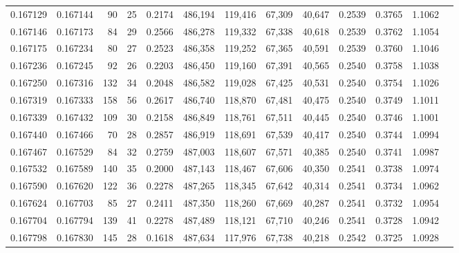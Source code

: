 \begin{tabular}{rrrrrrrrrrrrr}
0.167129 & 0.167144 &    90 &  25 &                                     0.2174 & 486,194 & 119,416 &  67,309 &  40,647 & 0.2539 & 0.3765 & 1.1062 \\
0.167146 & 0.167173 &    84 &  29 &                                     0.2566 & 486,278 & 119,332 &  67,338 &  40,618 & 0.2539 & 0.3762 & 1.1054 \\
0.167175 & 0.167234 &    80 &  27 &                                     0.2523 & 486,358 & 119,252 &  67,365 &  40,591 & 0.2539 & 0.3760 & 1.1046 \\
0.167236 & 0.167245 &    92 &  26 &                                     0.2203 & 486,450 & 119,160 &  67,391 &  40,565 & 0.2540 & 0.3758 & 1.1038 \\
0.167250 & 0.167316 &   132 &  34 &                                     0.2048 & 486,582 & 119,028 &  67,425 &  40,531 & 0.2540 & 0.3754 & 1.1026 \\
0.167319 & 0.167333 &   158 &  56 &                                     0.2617 & 486,740 & 118,870 &  67,481 &  40,475 & 0.2540 & 0.3749 & 1.1011 \\
0.167339 & 0.167432 &   109 &  30 &                                     0.2158 & 486,849 & 118,761 &  67,511 &  40,445 & 0.2540 & 0.3746 & 1.1001 \\
0.167440 & 0.167466 &    70 &  28 &                                     0.2857 & 486,919 & 118,691 &  67,539 &  40,417 & 0.2540 & 0.3744 & 1.0994 \\
0.167467 & 0.167529 &    84 &  32 &                                     0.2759 & 487,003 & 118,607 &  67,571 &  40,385 & 0.2540 & 0.3741 & 1.0987 \\
0.167532 & 0.167589 &   140 &  35 &                                     0.2000 & 487,143 & 118,467 &  67,606 &  40,350 & 0.2541 & 0.3738 & 1.0974 \\
0.167590 & 0.167620 &   122 &  36 &                                     0.2278 & 487,265 & 118,345 &  67,642 &  40,314 & 0.2541 & 0.3734 & 1.0962 \\
0.167624 & 0.167703 &    85 &  27 &                                     0.2411 & 487,350 & 118,260 &  67,669 &  40,287 & 0.2541 & 0.3732 & 1.0954 \\
0.167704 & 0.167794 &   139 &  41 &                                     0.2278 & 487,489 & 118,121 &  67,710 &  40,246 & 0.2541 & 0.3728 & 1.0942 \\
0.167798 & 0.167830 &   145 &  28 &                                     0.1618 & 487,634 & 117,976 &  67,738 &  40,218 & 0.2542 & 0.3725 & 1.0928 \\

\end{tabular}
